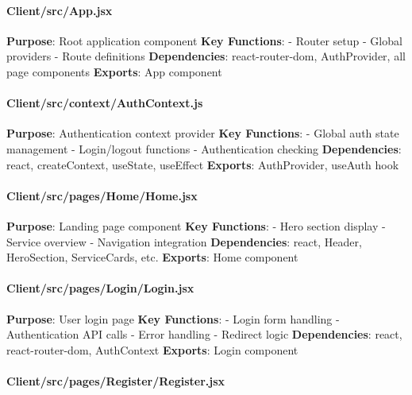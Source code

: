 \documentclass[12pt,a4paper]{article}
\begin{document}
\hypertarget{clientsrcapp.jsx}{%
\paragraph{Client/src/App.jsx}\label{clientsrcapp.jsx}}

\textbf{Purpose}: Root application component \textbf{Key Functions}: -
Router setup - Global providers - Route definitions
\textbf{Dependencies}: react-router-dom, AuthProvider, all page
components \textbf{Exports}: App component

\hypertarget{clientsrccontextauthcontext.js}{%
\paragraph{Client/src/context/AuthContext.js}\label{clientsrccontextauthcontext.js}}

\textbf{Purpose}: Authentication context provider \textbf{Key
Functions}: - Global auth state management - Login/logout functions -
Authentication checking \textbf{Dependencies}: react, createContext,
useState, useEffect \textbf{Exports}: AuthProvider, useAuth hook

\hypertarget{clientsrcpageshomehome.jsx}{%
\paragraph{Client/src/pages/Home/Home.jsx}\label{clientsrcpageshomehome.jsx}}

\textbf{Purpose}: Landing page component \textbf{Key Functions}: - Hero
section display - Service overview - Navigation integration
\textbf{Dependencies}: react, Header, HeroSection, ServiceCards, etc.
\textbf{Exports}: Home component

\hypertarget{clientsrcpagesloginlogin.jsx}{%
\paragraph{Client/src/pages/Login/Login.jsx}\label{clientsrcpagesloginlogin.jsx}}

\textbf{Purpose}: User login page \textbf{Key Functions}: - Login form
handling - Authentication API calls - Error handling - Redirect logic
\textbf{Dependencies}: react, react-router-dom, AuthContext
\textbf{Exports}: Login component

\hypertarget{clientsrcpagesregisterregister.jsx}{%
\paragraph{Client/src/pages/Register/Register.jsx}\label{clientsrcpagesregisterregister.jsx}}
\end{document}
